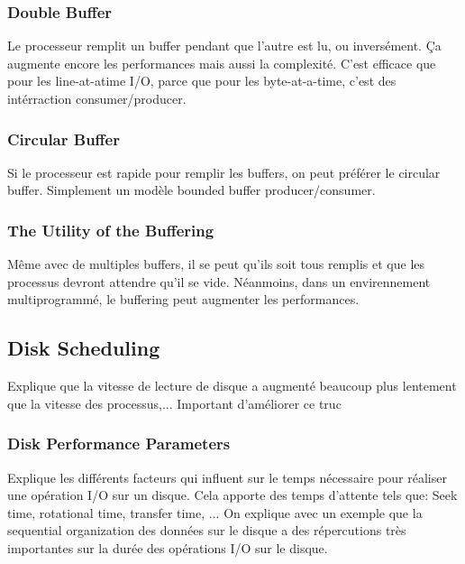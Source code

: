 \subsubsection{Double Buffer}
Le processeur remplit un buffer pendant que l'autre est lu, ou inversément.
Ça augmente encore les performances mais aussi la complexité.
C'est efficace que pour les line-at-atime I/O, parce que pour les byte-at-a-time, c'est des intérraction consumer/producer.


\subsubsection{Circular Buffer}
Si le processeur est rapide pour remplir les buffers, on peut préférer le circular buffer.
Simplement un modèle bounded buffer producer/consumer.
\subsubsection{The Utility of the Buffering}
Même avec de multiples buffers, il se peut qu'ils soit tous remplis et que les processus devront attendre qu'il se vide.
Néanmoins, dans un envirennement multiprogrammé, le buffering peut augmenter les performances.
\subsection{Disk Scheduling}
Explique que la vitesse de lecture de disque a augmenté beaucoup plus lentement que la vitesse des processus,...
Important d'améliorer ce truc
\subsubsection{Disk Performance Parameters}
Explique les différents facteurs qui influent sur le temps nécessaire pour réaliser une opération I/O sur un disque.
Cela apporte des temps d'attente tels que: Seek time, rotational time, transfer time, ...
On explique avec un exemple que la sequential organization des données sur le disque a des répercutions très importantes sur la durée des opérations I/O sur le disque.
